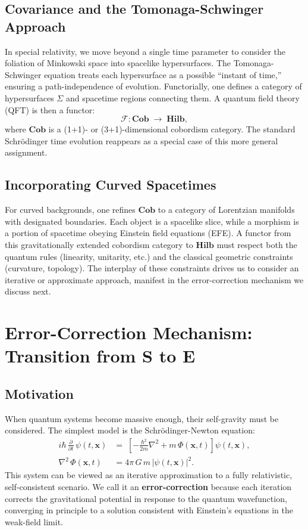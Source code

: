\documentclass[12pt]{article}
\begin{document}
\subsection{Covariance and the Tomonaga-Schwinger Approach}
In special relativity, we move beyond a single time parameter to consider the foliation of Minkowski space into spacelike hypersurfaces. The Tomonaga-Schwinger equation treats each hypersurface as a possible ``instant of time,'' ensuring a path-independence of evolution. Functorially, one defines a category of hypersurfaces \(\Sigma\) and spacetime regions connecting them. A quantum field theory (QFT) is then a functor:
\[
\mathcal{F}: \mathbf{Cob} \;\longrightarrow\; \mathbf{Hilb},
\]
where \(\mathbf{Cob}\) is a (1+1)- or (3+1)-dimensional cobordism category. The standard Schr\"odinger time evolution reappears as a special case of this more general assignment.

\subsection{Incorporating Curved Spacetimes}
For curved backgrounds, one refines \(\mathbf{Cob}\) to a category of Lorentzian manifolds with designated boundaries. Each object is a spacelike slice, while a morphism is a portion of spacetime obeying Einstein field equations (EFE). A functor from this gravitationally extended cobordism category to \(\mathbf{Hilb}\) must respect both the quantum rules (linearity, unitarity, etc.) and the classical geometric constraints (curvature, topology). The interplay of these constraints drives us to consider an iterative or approximate approach, manifest in the error-correction mechanism we discuss next.

\section{Error-Correction Mechanism: Transition from \(\mathbf{S}\) to \(\mathbf{E}\)}
\subsection{Motivation}
When quantum systems become massive enough, their self-gravity must be considered. The simplest model is the Schr\"odinger-Newton equation:
\begin{align}
i \hbar \,\frac{\partial}{\partial t}\,\psi(t,\mathbf{x}) 
&=\; \left[ -\frac{\hbar^2}{2m}\nabla^2 + m\,\Phi(\mathbf{x},t)\right]\psi(t,\mathbf{x}),\\
\nabla^2\,\Phi(\mathbf{x},t) & = 4\pi\,G\,m\,|\psi(t,\mathbf{x})|^2.
\end{align}
This system can be viewed as an iterative approximation to a fully relativistic, self-consistent scenario. We call it an \textbf{error-correction} because each iteration corrects the gravitational potential in response to the quantum wavefunction, converging in principle to a solution consistent with Einstein's equations in the weak-field limit.
\end{document}
